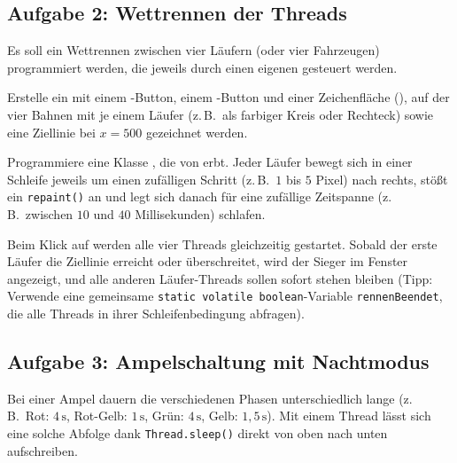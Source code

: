 \subsection{Aufgabe 2: Wettrennen der Threads}

Es soll ein Wettrennen zwischen vier Läufern (oder vier Fahrzeugen)
programmiert werden, die jeweils durch einen eigenen 
gesteuert werden.

\begin{compactenum}[a)]
\item Erstelle ein  mit einem -Button, einem
-Button und einer Zeichenfläche (), auf der
vier Bahnen mit je einem Läufer (z.\,B.\ als farbiger Kreis oder Rechteck)
sowie eine Ziellinie bei $x = 500$ gezeichnet werden.

\item Programmiere eine Klasse , die von
 erbt. Jeder Läufer bewegt sich in einer Schleife jeweils um
einen zufälligen Schritt (z.\,B.\ $1$ bis $5$ Pixel) nach rechts, stößt ein
\lstinline|repaint()| an und legt sich danach für eine zufällige Zeitspanne
(z.\,B.\ zwischen $10$ und $40$ Millisekunden) schlafen.

\item Beim Klick auf  werden alle vier Threads gleichzeitig
gestartet. Sobald der erste Läufer die Ziellinie erreicht oder überschreitet,
wird der Sieger im Fenster angezeigt, und alle anderen Läufer-Threads sollen
sofort stehen bleiben (Tipp: Verwende eine gemeinsame
\lstinline|static volatile boolean|-Variable \lstinline|rennenBeendet|, die
alle Threads in ihrer Schleifenbedingung abfragen).
\end{compactenum}


\subsection{Aufgabe 3: Ampelschaltung mit Nachtmodus}

Bei einer Ampel dauern die verschiedenen Phasen unterschiedlich lange (z.\,B.\
Rot: $4\,\text{s}$, Rot-Gelb: $1\,\text{s}$, Grün: $4\,\text{s}$, Gelb:
$1{,}5\,\text{s}$). Mit einem Thread lässt sich eine solche Abfolge dank
\lstinline|Thread.sleep()| direkt von oben nach unten aufschreiben.

